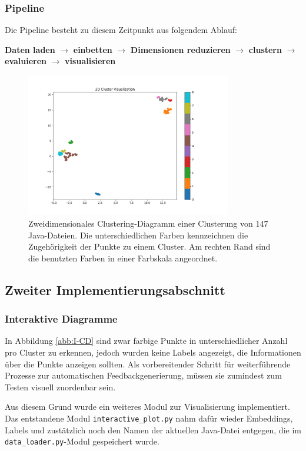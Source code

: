 \subsubsection*{Pipeline}
Die Pipeline besteht zu diesem Zeitpunkt aus folgendem Ablauf:

\textbf{Daten laden} $\rightarrow$ \textbf{einbetten} $\rightarrow$ \textbf{Dimensionen reduzieren} $\rightarrow$ \textbf{clustern} $\rightarrow$ \textbf{evaluieren} $\rightarrow$ \textbf{visualisieren}

\begin{figure} %
	\centering
	\includegraphics[width=0.8\textwidth]{images/Erstes Clustering-Diagramm.pdf}
	\caption{Zweidimensionales Clustering-Diagramm einer Clusterung von 147 Java-Dateien. Die unterschiedlichen Farben kennzeichnen die Zugehörigkeit der Punkte zu einem Cluster. Am rechten Rand sind die benutzten Farben in einer Farbskala angeordnet.}
	\label{abb:E-CD}
\end{figure}


\subsection{Zweiter Implementierungsabschnitt}
\subsubsection*{Interaktive Diagramme}
In Abbildung \ref{abb:I-CD} sind zwar farbige Punkte in unterschiedlicher Anzahl pro Cluster zu erkennen, jedoch wurden keine Labels angezeigt, die Informationen über die Punkte anzeigen sollten. Als vorbereitender Schritt für weiterführende Prozesse zur automatischen Feedbackgenerierung, müssen sie zumindest zum Testen visuell zuordenbar sein.

Aus diesem Grund wurde ein weiteres Modul zur Visualisierung implementiert. Das entstandene Modul \texttt{interactive\_plot.py} nahm dafür wieder Embeddings, Labels und zustätzlich noch den Namen der aktuellen Java-Datei entgegen, die im \texttt{data\_loader.py}-Modul gespeichert wurde.

